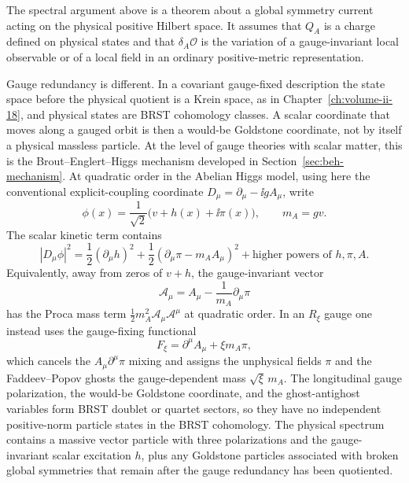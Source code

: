 \begin{remark}
\label{rem:goldstone-gauge-brst-higgs}
The spectral argument above is a theorem about a global symmetry current acting
on the physical positive Hilbert space.  It assumes that \(Q_A\) is a charge
defined on physical states and that \(\delta_A\mathcal O\) is the variation of
a gauge-invariant local observable or of a local field in an ordinary
positive-metric representation.

Gauge redundancy is different.  In a covariant gauge-fixed description the
state space before the physical quotient is a Krein space, as in
Chapter~\ref{ch:volume-ii-18}, and physical states are BRST cohomology
classes.  A scalar coordinate that moves along a gauged orbit is then a
would-be Goldstone coordinate, not by itself a physical massless particle.  At
the level of gauge theories with scalar matter, this is the
Brout--Englert--Higgs mechanism developed in
Section~\ref{sec:beh-mechanism}.  At
quadratic order in the Abelian Higgs model, using here the conventional
explicit-coupling coordinate \(D_\mu=\partial_\mu-\ii gA_\mu\), write
\[
  \phi(x)=\frac{1}{\sqrt2}\bigl(v+h(x)+\ii\pi(x)\bigr),
  \qquad
  m_A=gv .
\]
The scalar kinetic term contains
\begin{equation}
  |D_\mu\phi|^2
  =
  \frac12(\partial_\mu h)^2
  +
  \frac12(\partial_\mu\pi-m_A A_\mu)^2
  +\text{higher powers of }h,\pi,A .
  \label{eq:abelian-higgs-quadratic-mixing}
\end{equation}
Equivalently, away from zeros of \(v+h\), the gauge-invariant vector
\[
  \mathcal A_\mu
  =
  A_\mu-\frac{1}{m_A}\partial_\mu\pi
\]
has the Proca mass term \(\frac12m_A^2\mathcal A_\mu\mathcal A^\mu\) at
quadratic order.  In an \(R_\xi\) gauge one instead uses the gauge-fixing
functional
\[
  F_\xi=\partial^\mu A_\mu+\xi m_A\pi ,
\]
which cancels the \(A_\mu\partial^\mu\pi\) mixing and assigns the unphysical
fields \(\pi\) and the Faddeev--Popov ghosts the gauge-dependent mass
\(\sqrt{\xi}\,m_A\).  The longitudinal gauge polarization, the would-be
Goldstone coordinate, and the ghost-antighost variables form BRST doublet or
quartet sectors, so they have no independent positive-norm particle states in
the BRST cohomology.  The physical spectrum contains a massive vector particle
with three polarizations and the gauge-invariant scalar excitation \(h\), plus
any Goldstone particles associated with broken global symmetries that remain
after the gauge redundancy has been quotiented.
\end{remark}

